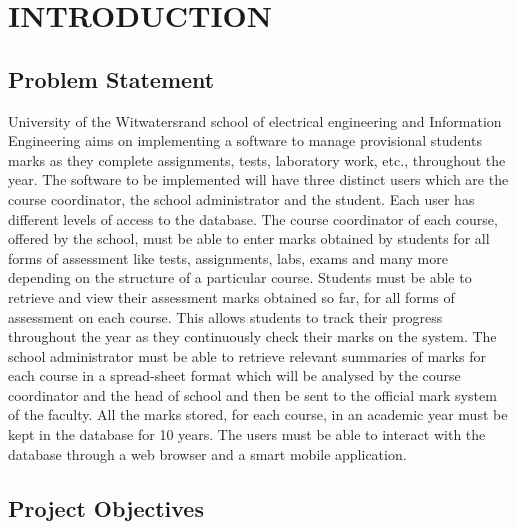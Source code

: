\documentclass[10pt,onecolumn]{MainDocument}
\begin{document}
\section{INTRODUCTION}

\subsection{Problem Statement}

University of the Witwatersrand school of electrical engineering and Information Engineering aims on implementing a software to manage  provisional students marks as they complete assignments, tests, laboratory work, etc., throughout the year. The software to be implemented will have three distinct users which are the course coordinator, the school administrator and the student. Each user has different levels of access to the database. The course coordinator of each course, offered  by the school, must be able to enter marks obtained by students for all forms of assessment like tests, assignments, labs, exams and many more depending on the structure of a particular course. Students must be able to retrieve and view their assessment marks obtained so far, for all forms of assessment on each course. This allows students to track  their progress throughout the year as they continuously check their marks on the system. The school administrator must be able to retrieve relevant summaries of marks for each course in a spread-sheet format which will be analysed by the course coordinator and the head of school and then be sent to the official mark system of the faculty. All the marks stored, for each course, in an academic year must be kept in the database for 10 years. The users must be able to interact with the database through a web browser and a smart mobile application. 
 
\subsection{Project Objectives}
\end{document}
